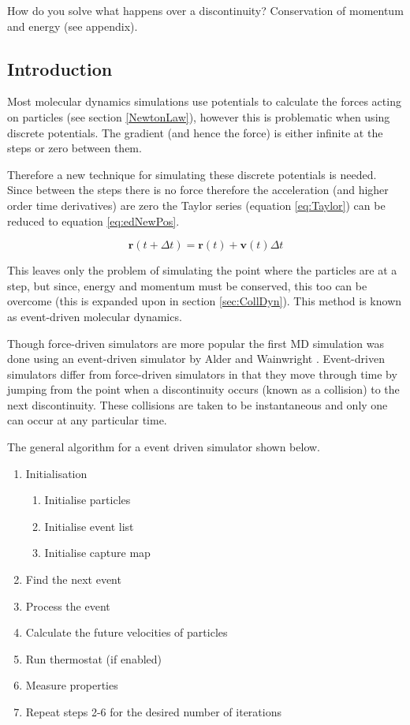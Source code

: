 \message{ !name(main.tex)}\documentclass[12pt]{UoAthesis}
\begin{document}
How do you solve what happens over a discontinuity? Conservation of
momentum and energy (see appendix).

\subsection{Introduction} 

Most molecular dynamics simulations use potentials to calculate the
forces acting on particles (see section \ref{NewtonLaw}), however this
is problematic when using discrete potentials.  The gradient (and
hence the force) is either infinite at the steps or zero between them.

Therefore a new technique for simulating these discrete potentials is
needed.  Since between the steps there is no force therefore the
acceleration (and higher order time derivatives) are zero the Taylor
series (equation \eqref{eq:Taylor}) can be reduced to equation
\eqref{eq:edNewPos}.

\begin{equation}
  \mathbf{r}(t+\Delta t) = \mathbf{r}(t) + \mathbf{v}(t)\Delta t 
  \label{eq:edNewPos}
\end{equation}

This leaves only the problem of simulating the point where the
particles are at a step, but since, energy and momentum must be
conserved, this too can be overcome (this is expanded upon in section
\ref{sec:CollDyn}).  This method is known as event-driven molecular
dynamics.

Though force-driven simulators are more popular the first MD
simulation was done using an event-driven simulator by Alder and
Wainwright \cite{Alder1957}. Event-driven simulators differ from
force-driven simulators in that they move through time by jumping from
the point when a discontinuity occurs (known as a collision) to the
next discontinuity.  These collisions are taken to be instantaneous
and only one can occur at any particular time.

The general algorithm for a event driven simulator shown below.

\begin{flushleft}
  \begin{enumerate} 
  \item Initialisation 
    \begin{enumerate}
      \item Initialise particles
      \item Initialise event list
      \item Initialise capture map
    \end{enumerate}
  \item Find the next event
  \item Process the event
  \item Calculate the future velocities of particles 
  \item Run thermostat (if enabled) 
  \item Measure properties 
  \item Repeat steps 2-6 for the desired number of iterations
  \end{enumerate} 
\end{flushleft}
\end{document}
